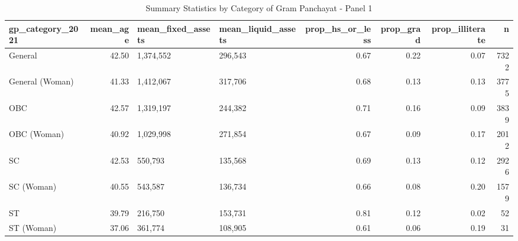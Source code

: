 \begin{table}[!h]

\caption{\label{tab:tab:summary_statistics1}Summary Statistics by Category of Gram Panchayat - Panel 1}
\centering
\begin{tabular}[t]{lrllrrrr}
\toprule
gp\_category\_2021 & mean\_age & mean\_fixed\_assets & mean\_liquid\_assets & prop\_hs\_or\_less & prop\_grad & prop\_illiterate & n\\
\midrule
General & 42.50 & 1,374,552 & 296,543 & 0.67 & 0.22 & 0.07 & 7322\\
General (Woman) & 41.33 & 1,412,067 & 317,706 & 0.68 & 0.13 & 0.13 & 3775\\
OBC & 42.57 & 1,319,197 & 244,382 & 0.71 & 0.16 & 0.09 & 3839\\
OBC (Woman) & 40.92 & 1,029,998 & 271,854 & 0.67 & 0.09 & 0.17 & 2012\\
SC & 42.53 & 550,793 & 135,568 & 0.69 & 0.13 & 0.12 & 2926\\
\addlinespace
SC (Woman) & 40.55 & 543,587 & 136,734 & 0.66 & 0.08 & 0.20 & 1579\\
ST & 39.79 & 216,750 & 153,731 & 0.81 & 0.12 & 0.02 & 52\\
ST (Woman) & 37.06 & 361,774 & 108,905 & 0.61 & 0.06 & 0.19 & 31\\
\bottomrule
\end{tabular}
\end{table}
